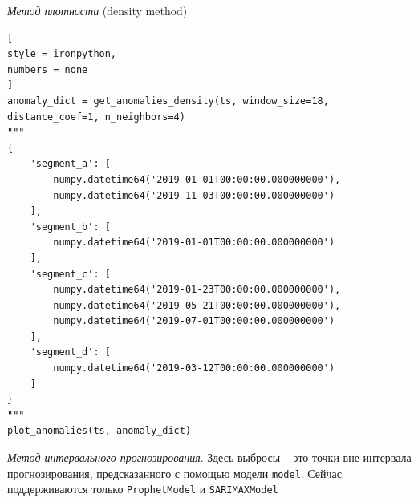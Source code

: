 \documentclass[%
	11pt,
	a4paper,
	utf8,
		]{article}
\begin{document}
\emph{Метод плотности} (density method)
\begin{lstlisting}[
style = ironpython,
numbers = none
]
anomaly_dict = get_anomalies_density(ts, window_size=18, distance_coef=1, n_neighbors=4)
"""
{
	'segment_a': [
	    numpy.datetime64('2019-01-01T00:00:00.000000000'),
	    numpy.datetime64('2019-11-03T00:00:00.000000000')
	],
	'segment_b': [
	    numpy.datetime64('2019-01-01T00:00:00.000000000')
	],
	'segment_c': [
	    numpy.datetime64('2019-01-23T00:00:00.000000000'),
	    numpy.datetime64('2019-05-21T00:00:00.000000000'),
	    numpy.datetime64('2019-07-01T00:00:00.000000000')
	],
	'segment_d': [
	    numpy.datetime64('2019-03-12T00:00:00.000000000')
	]
}
"""
plot_anomalies(ts, anomaly_dict)
\end{lstlisting}

\emph{Метод интервального прогнозирования}. Здесь выбросы -- это точки вне интервала прогнозирования, предсказанного с помощью модели \verb|model|. Сейчас поддерживаются только \verb|ProphetModel| и \verb|SARIMAXModel|
\end{document}
